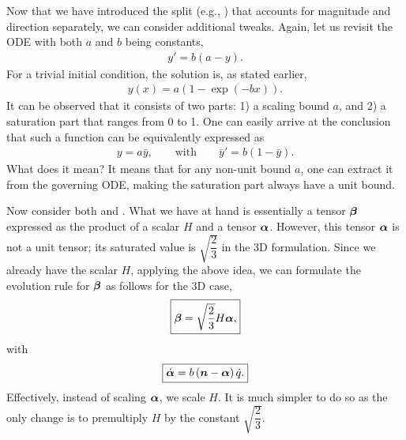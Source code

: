Now that we have introduced the split (e.g., ) that accounts for magnitude and direction separately, we can consider additional tweaks.
Again, let us revisit the ODE  with both $a$ and $b$ being constants,
\begin{gather}
    y'=b(a-y).
\end{gather}
For a trivial initial condition, the solution is, as stated earlier,
\begin{gather}
    y(x)=a\left(1-\exp\left(-bx\right)\right).
\end{gather}
It can be observed that it consists of two parts: 1) a scaling bound $a$, and 2) a saturation part that ranges from \num{0} to \num{1}.
One can easily arrive at the conclusion that such a function can be equivalently expressed as
\begin{gather}
    y=a\bar{y},\qquad\text{with}\qquad\bar{y}'=b(1-\bar{y}).
\end{gather}
What does it mean?
It means that for any non-unit bound $a$, one can extract it from the governing ODE, making the saturation part always have a unit bound.

Now consider both  and .
What we have at hand is essentially a tensor $\bm{\beta}$ expressed as the product of a scalar $H$ and a tensor $\bm{\alpha}$.
However, this tensor $\bm{\alpha}$ is not a unit tensor; its saturated value is $\sqrt{\dfrac{2}{3}}$ in the 3D formulation.
Since we already have the scalar $H$, applying the above idea, we can formulate the evolution rule for $\bm{\beta}$ as follows for the 3D case,
\begin{gather}
    \boxed{\bm{\beta}=\sqrt{\dfrac{2}{3}}H\bm{\alpha},}
\end{gather}
with
\begin{gather}
    \boxed{\dot{\bm{\alpha}}=b\left(\bm{n}-\bm{\alpha}\right)\dot{q}.}
\end{gather}
Effectively, instead of scaling $\bm{\alpha}$, we scale $H$.
It is much simpler to do so as the only change is to premultiply $H$ by the constant $\sqrt{\dfrac{2}{3}}$.

